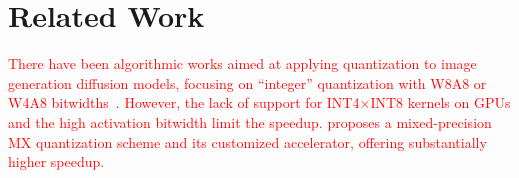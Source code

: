 \vspace{-0.2cm}
\section{Related Work}

\textcolor{red}{
%
There have been algorithmic works aimed at applying quantization to image generation diffusion models, focusing on ``integer''  quantization with W8A8 or W4A8 bitwidths~\cite{qdit, viditq, ptq4dit}.
%
However, the lack of support for INT4$\times$INT8 kernels on GPUs and the high activation bitwidth limit the speedup. 
%
\sysname proposes a mixed-precision MX quantization scheme and its customized accelerator, offering substantially higher speedup.
}
